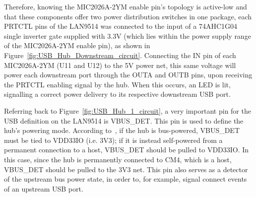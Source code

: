 Therefore, knowing the MIC2026A-2YM enable pin's topology is active-low and that these components offer two power distribution switches in one package, each PRTCTL pins of the LAN9514 was connected to the input of a 74AHC1G04 single inverter gate supplied with 3.3V (which lies within the power supply range of the MIC2026A-2YM enable pin), as shown in Figure~\ref{fig:USB_Hub_Downstream_circuit}. Connecting the IN pin of each MIC2026A-2YM (U11 and U12) to the 5V power net, this same voltage will power each downstream port through the OUTA and OUTB pins, upon receiving the PRTCTL enabling signal by the hub. When this occurs, an LED is lit, signalling a correct power delivery to its respective downstream USB port.

Referring back to Figure~\ref{fig:USB_Hub_1_circuit}, a very important pin for the USB definition on the LAN9514 is VBUS\_DET. This pin is used to define the hub's powering mode.
According to~\cite{LAN9514}, if the hub is bus-powered, VBUS\_DET must be tied to VDD33IO (i.e. 3V3); if it is instead self-powered from a permanent connection to a host, VBUS\_DET should be pulled to VDD33IO. In this case, since the hub is permanently connected to CM4, which is a host, VBUS\_DET should be pulled to the 3V3 net. This pin also serves as a detector of the upstream bus power state, in order to, for example, signal connect events of an upstream USB port.	


